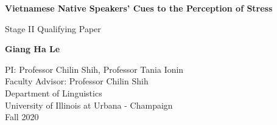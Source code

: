 \documentclass[a4paper]{article}
\begin{document}
\begin{titlepage}
   \begin{center}
       \vspace*{1cm}
	 \Huge
       \textbf{Vietnamese Native Speakers' Cues to the Perception of Stress}
       
 	\LARGE
       \vspace{0.5cm}
        Stage II Qualifying Paper
 
       \vspace{1.5cm}
 
       \textbf{Giang Ha Le}
 
       \vfill
 
       \vspace{0.8cm}
 
	PI: Professor Chilin Shih, Professor Tania Ionin \\
	Faculty Advisor: Professor Chilin Shih \\
       Department of Linguistics \\
       University of Illinois at Urbana - Champaign\\
       Fall 2020
 
   \end{center}
\end{titlepage}
\end{document}
